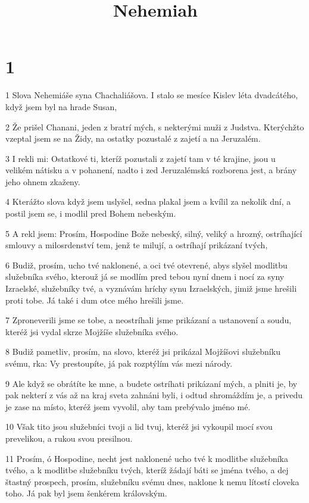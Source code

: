

\title{Nehemiah}

\chapter{1}

\par 1 Slova Nehemiáše syna Chachaliášova. I stalo se mesíce Kislev léta dvadcátého, když jsem byl na hrade Susan,
\par 2 Že prišel Chanani, jeden z bratrí mých, s nekterými muži z Judstva. Kterýchžto vzeptal jsem se na Židy, na ostatky pozustalé z zajetí a na Jeruzalém.
\par 3 I rekli mi: Ostatkové ti, kteríž pozustali z zajetí tam v té krajine, jsou u velikém nátisku a v pohanení, nadto i zed Jeruzalémská rozborena jest, a brány jeho ohnem zkaženy.
\par 4 Kterážto slova když jsem uslyšel, sedna plakal jsem a kvílil za nekolik dní, a postil jsem se, i modlil pred Bohem nebeským.
\par 5 A rekl jsem: Prosím, Hospodine Bože nebeský, silný, veliký a hrozný, ostríhající smlouvy a milosrdenství tem, jenž te milují, a ostríhají prikázaní tvých,
\par 6 Budiž, prosím, ucho tvé naklonené, a oci tvé otevrené, abys slyšel modlitbu služebníka svého, kterouž já se modlím pred tebou nyní dnem i nocí za syny Izraelské, služebníky tvé, a vyznávám hríchy synu Izraelských, jimiž jsme hrešili proti tobe. Já také i dum otce mého hrešili jsme.
\par 7 Zproneverili jsme se tobe, a neostríhali jsme prikázaní a ustanovení a soudu, kteréž jsi vydal skrze Mojžíše služebníka svého.
\par 8 Budiž pametliv, prosím, na slovo, kteréž jsi prikázal Mojžíšovi služebníku svému, rka: Vy prestoupíte, já pak rozptýlím vás mezi národy.
\par 9 Ale když se obrátíte ke mne, a budete ostríhati prikázaní mých, a plniti je, by pak nekterí z vás až na kraj sveta zahnáni byli, i odtud shromáždím je, a privedu je zase na místo, kteréž jsem vyvolil, aby tam prebývalo jméno mé.
\par 10 Však tito jsou služebníci tvoji a lid tvuj, kteréž jsi vykoupil mocí svou prevelikou, a rukou svou presilnou.
\par 11 Prosím, ó Hospodine, necht jest naklonené ucho tvé k modlitbe služebníka tvého, a k modlitbe služebníku tvých, kteríž žádají báti se jména tvého, a dej štastný prospech, prosím, služebníku svému dnes, naklone k nemu lítostí cloveka toho. Já pak byl jsem šenkérem královským.

